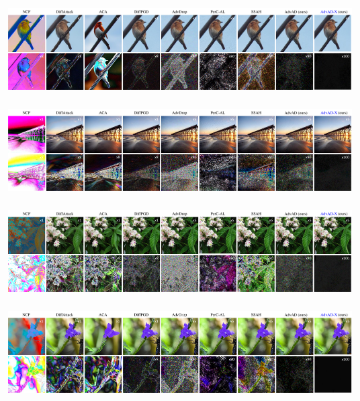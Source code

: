 \documentclass{article}
\begin{document}
\begin{figure}[htbp]
\centering
\begin{subfigure}
    \centering
    \includegraphics[width=1\textwidth]{figures/app_vis_new_1.pdf}
    \label{fig:subfig1}
    \vspace{-0.5cm}
\end{subfigure}
\begin{subfigure}
    \centering
    \includegraphics[width=1\textwidth]{figures/app_vis_new_2.pdf}
    \label{fig:subfig2}
    \vspace{-0.5cm}
\end{subfigure}
\begin{subfigure}
    \centering
    \includegraphics[width=1\textwidth]{figures/app_vis_new_3.pdf}
    \label{fig:subfig3}
    \vspace{-0.5cm}
\end{subfigure}
\begin{subfigure}
    \centering
    \includegraphics[width=1\textwidth]{figures/app_vis_new_4.pdf}
    \label{fig:subfig4}
    \vspace{-0.5cm}
\end{subfigure}

\end{figure}
\end{document}
